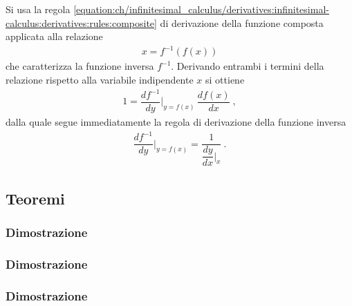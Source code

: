\documentclass[letterpaper,10pt,english]{jupyterBook}
\begin{document}
\sphinxAtStartPar
Si usa la regola \eqref{equation:ch/infinitesimal_calculus/derivatives:infinitesimal-calculus:derivatives:rules:composite} di derivazione della funzione composta applicata alla relazione
\begin{equation*}
\begin{split}x = f^{-1} \left( f(x) \right)\end{split}
\end{equation*}
\sphinxAtStartPar
che caratterizza la funzione inversa \(f^{-1}\). Derivando entrambi i termini della relazione rispetto alla variabile indipendente \(x\) si ottiene
\begin{equation*}
\begin{split}1 = \dfrac{d f^{-1}}{d y}\bigg|_{y = f(x)} \, \dfrac{d f(x)}{d x} \ ,\end{split}
\end{equation*}
\sphinxAtStartPar
dalla quale segue immediatamente la regola di derivazione della funzione inversa
\begin{equation*}
\begin{split} \dfrac{d f^{-1}}{d y}\bigg|_{y = f(x)} = \dfrac{1}{ \dfrac{d y}{d x}\bigg|_{x}} \ .\end{split}
\end{equation*}

\subsection{Teoremi}
\label{\detokenize{ch/infinitesimal_calculus/derivatives:teoremi}}\label{\detokenize{ch/infinitesimal_calculus/derivatives:infinitesimal-calculus-derivatives-thm}}\label{\detokenize{ch/infinitesimal_calculus/derivatives:infinitesimal-calculus-derivatives-thm-fermat}}\subsubsection*{Dimostrazione}

\sphinxAtStartPar
{}


\label{\detokenize{ch/infinitesimal_calculus/derivatives:infinitesimal-calculus-derivatives-thm-rolle}}\subsubsection*{Dimostrazione}

\sphinxAtStartPar
{}
\label{\detokenize{ch/infinitesimal_calculus/derivatives:infinitesimal-calculus-derivatives-thm-cauchy}}\subsubsection*{Dimostrazione}
\end{document}

